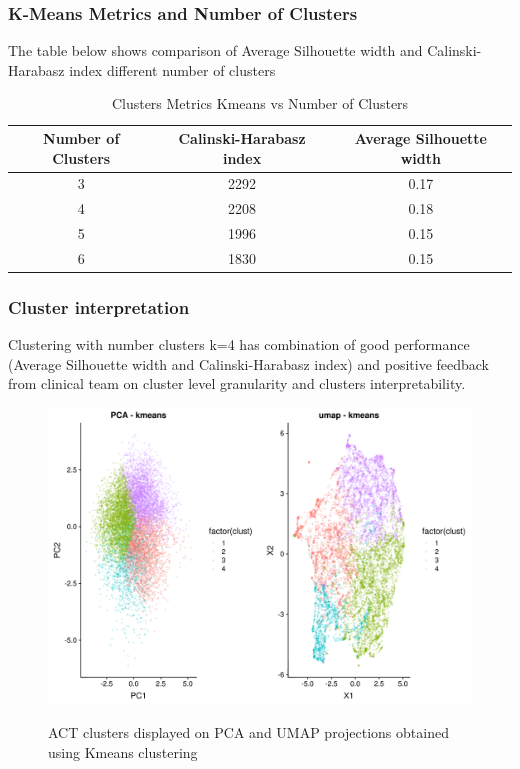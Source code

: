 \documentclass{article}
\begin{document}
\subsubsection{K-Means Metrics and Number of Clusters}
The table below shows comparison of Average Silhouette width and Calinski-Harabasz index different number of clusters

\begin{table}[H]
  \caption{Clusters Metrics Kmeans vs Number of Clusters}
  \label{steps_metrics}
  \centering
  \begin{tabular}{ c|c|c}
    \toprule
    \cmidrule(r){1-2}
    Number of Clusters & Calinski-Harabasz index & Average Silhouette width \\
    \midrule
    3 & 2292 & 0.17 \\
    4 & 2208 & 0.18 \\
    5 & 1996 & 0.15 \\
    6 & 1830 & 0.15 \\
    \bottomrule
    \end{tabular}
\end{table}

\subsubsection{Cluster interpretation}
Clustering with number clusters k=4 has combination of good performance (Average Silhouette width and Calinski-Harabasz index) and positive feedback from clinical team on cluster level granularity and clusters interpretability. 

\begin{figure}
  \centering
  \caption{ACT clusters displayed on PCA and UMAP projections obtained using Kmeans clustering}
  \includegraphics[scale=0.5]{fig_ACT_4_clusters.png}
  \label{fig:figACT4clusters}
\end{figure}
\end{document}
